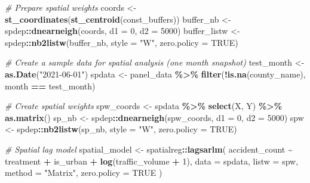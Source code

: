 \documentclass[
]{article}
\newenvironment{Shaded}{\begin{snugshade}}{\end{snugshade}}
\newcommand{\AttributeTok}[1]{\textcolor[rgb]{0.13,0.29,0.53}{#1}}
\newcommand{\CommentTok}[1]{\textcolor[rgb]{0.56,0.35,0.01}{\textit{#1}}}
\newcommand{\ConstantTok}[1]{\textcolor[rgb]{0.56,0.35,0.01}{#1}}
\newcommand{\DecValTok}[1]{\textcolor[rgb]{0.00,0.00,0.81}{#1}}
\newcommand{\FunctionTok}[1]{\textcolor[rgb]{0.13,0.29,0.53}{\textbf{#1}}}
\newcommand{\NormalTok}[1]{#1}
\newcommand{\OtherTok}[1]{\textcolor[rgb]{0.56,0.35,0.01}{#1}}
\newcommand{\SpecialCharTok}[1]{\textcolor[rgb]{0.81,0.36,0.00}{\textbf{#1}}}
\newcommand{\StringTok}[1]{\textcolor[rgb]{0.31,0.60,0.02}{#1}}
\begin{document}
\begin{Shaded}
\begin{Highlighting}[]
\CommentTok{\# Prepare spatial weights}
\NormalTok{coords }\OtherTok{\textless{}{-}} \FunctionTok{st\_coordinates}\NormalTok{(}\FunctionTok{st\_centroid}\NormalTok{(const\_buffers))}
\NormalTok{buffer\_nb }\OtherTok{\textless{}{-}}\NormalTok{ spdep}\SpecialCharTok{::}\FunctionTok{dnearneigh}\NormalTok{(coords, }\AttributeTok{d1 =} \DecValTok{0}\NormalTok{, }\AttributeTok{d2 =} \DecValTok{5000}\NormalTok{)}
\NormalTok{buffer\_listw }\OtherTok{\textless{}{-}}\NormalTok{ spdep}\SpecialCharTok{::}\FunctionTok{nb2listw}\NormalTok{(buffer\_nb, }\AttributeTok{style =} \StringTok{"W"}\NormalTok{, }\AttributeTok{zero.policy =} \ConstantTok{TRUE}\NormalTok{)}

\CommentTok{\# Create a sample data for spatial analysis (one month snapshot)}
\NormalTok{test\_month }\OtherTok{\textless{}{-}} \FunctionTok{as.Date}\NormalTok{(}\StringTok{"2021{-}06{-}01"}\NormalTok{)}
\NormalTok{spdata }\OtherTok{\textless{}{-}}\NormalTok{ panel\_data }\SpecialCharTok{\%\textgreater{}\%}
  \FunctionTok{filter}\NormalTok{(}\SpecialCharTok{!}\FunctionTok{is.na}\NormalTok{(county\_name), month }\SpecialCharTok{==}\NormalTok{ test\_month)}

\CommentTok{\# Create spatial weights}
\NormalTok{spw\_coords }\OtherTok{\textless{}{-}}\NormalTok{ spdata }\SpecialCharTok{\%\textgreater{}\%}
  \FunctionTok{select}\NormalTok{(X, Y) }\SpecialCharTok{\%\textgreater{}\%}
  \FunctionTok{as.matrix}\NormalTok{()}
\NormalTok{sp\_nb }\OtherTok{\textless{}{-}}\NormalTok{ spdep}\SpecialCharTok{::}\FunctionTok{dnearneigh}\NormalTok{(spw\_coords, }\AttributeTok{d1 =} \DecValTok{0}\NormalTok{, }\AttributeTok{d2 =} \DecValTok{5000}\NormalTok{)}
\NormalTok{spw }\OtherTok{\textless{}{-}}\NormalTok{ spdep}\SpecialCharTok{::}\FunctionTok{nb2listw}\NormalTok{(sp\_nb, }\AttributeTok{style =} \StringTok{"W"}\NormalTok{, }\AttributeTok{zero.policy =} \ConstantTok{TRUE}\NormalTok{)}

\CommentTok{\# Spatial lag model}
\NormalTok{spatial\_model }\OtherTok{\textless{}{-}}\NormalTok{ spatialreg}\SpecialCharTok{::}\FunctionTok{lagsarlm}\NormalTok{(}
\NormalTok{  accident\_count }\SpecialCharTok{\textasciitilde{}}\NormalTok{ treatment }\SpecialCharTok{+}\NormalTok{ is\_urban }\SpecialCharTok{+} \FunctionTok{log}\NormalTok{(traffic\_volume }\SpecialCharTok{+} \DecValTok{1}\NormalTok{),}
  \AttributeTok{data =}\NormalTok{ spdata,}
  \AttributeTok{listw =}\NormalTok{ spw,}
  \AttributeTok{method =} \StringTok{"Matrix"}\NormalTok{,}
  \AttributeTok{zero.policy =} \ConstantTok{TRUE}
\NormalTok{)}
\end{Highlighting}
\end{Shaded}
\end{document}
